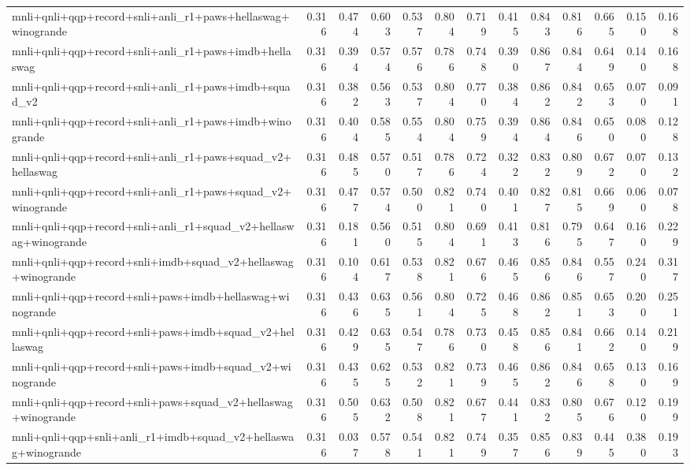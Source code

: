 \begin{table}[t]
\begin{tabular}{lrrrrrrrrrrrr}
    mnli+qnli+qqp+record+snli+anli\_r1+paws+hellaswag+winogrande & 0.316 & 0.474 & 0.603 & 0.537 & 0.804 & 0.719 & 0.415 & 0.843 & 0.816 & 0.665 & 0.150 & 0.168 \\
    mnli+qnli+qqp+record+snli+anli\_r1+paws+imdb+hellaswag & 0.316 & 0.394 & 0.574 & 0.576 & 0.786 & 0.748 & 0.390 & 0.867 & 0.844 & 0.649 & 0.140 & 0.168 \\
    mnli+qnli+qqp+record+snli+anli\_r1+paws+imdb+squad\_v2 & 0.316 & 0.382 & 0.563 & 0.537 & 0.804 & 0.770 & 0.384 & 0.862 & 0.842 & 0.653 & 0.070 & 0.091 \\
    mnli+qnli+qqp+record+snli+anli\_r1+paws+imdb+winogrande & 0.316 & 0.404 & 0.585 & 0.554 & 0.804 & 0.759 & 0.394 & 0.864 & 0.846 & 0.650 & 0.080 & 0.128 \\
    mnli+qnli+qqp+record+snli+anli\_r1+paws+squad\_v2+hellaswag & 0.316 & 0.485 & 0.570 & 0.517 & 0.786 & 0.724 & 0.322 & 0.832 & 0.809 & 0.672 & 0.070 & 0.132 \\
    mnli+qnli+qqp+record+snli+anli\_r1+paws+squad\_v2+winogrande & 0.316 & 0.477 & 0.574 & 0.500 & 0.821 & 0.740 & 0.401 & 0.827 & 0.815 & 0.669 & 0.060 & 0.078 \\
    mnli+qnli+qqp+record+snli+anli\_r1+squad\_v2+hellaswag+winogrande & 0.316 & 0.181 & 0.560 & 0.515 & 0.804 & 0.691 & 0.413 & 0.816 & 0.795 & 0.647 & 0.160 & 0.229 \\
    mnli+qnli+qqp+record+snli+imdb+squad\_v2+hellaswag+winogrande & 0.316 & 0.104 & 0.617 & 0.538 & 0.821 & 0.676 & 0.465 & 0.856 & 0.846 & 0.557 & 0.240 & 0.317 \\
    mnli+qnli+qqp+record+snli+paws+imdb+hellaswag+winogrande & 0.316 & 0.436 & 0.635 & 0.561 & 0.804 & 0.725 & 0.468 & 0.862 & 0.851 & 0.653 & 0.200 & 0.251 \\
    mnli+qnli+qqp+record+snli+paws+imdb+squad\_v2+hellaswag & 0.316 & 0.429 & 0.635 & 0.547 & 0.786 & 0.730 & 0.458 & 0.856 & 0.841 & 0.662 & 0.140 & 0.219 \\
    mnli+qnli+qqp+record+snli+paws+imdb+squad\_v2+winogrande & 0.316 & 0.435 & 0.625 & 0.532 & 0.821 & 0.739 & 0.465 & 0.862 & 0.846 & 0.658 & 0.130 & 0.169 \\
    mnli+qnli+qqp+record+snli+paws+squad\_v2+hellaswag+winogrande & 0.316 & 0.505 & 0.632 & 0.508 & 0.821 & 0.677 & 0.441 & 0.832 & 0.805 & 0.676 & 0.120 & 0.199 \\
    mnli+qnli+qqp+snli+anli\_r1+imdb+squad\_v2+hellaswag+winogrande & 0.316 & 0.037 & 0.578 & 0.541 & 0.821 & 0.749 & 0.357 & 0.856 & 0.839 & 0.445 & 0.380 & 0.193 \\

\end{tabular}
\end{table}
